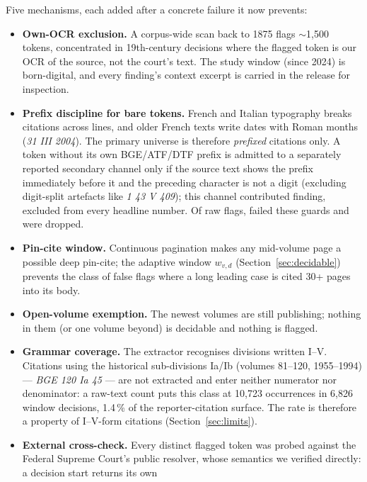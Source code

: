 \documentclass[11pt,a4paper]{article}
\begin{document}
Five mechanisms, each added after a concrete failure it now prevents:
\begin{itemize}
\item \textbf{Own-OCR exclusion.} A corpus-wide scan back to 1875 flags
      $\sim$1{,}500 tokens, concentrated in 19th-century decisions
      where the flagged token is our OCR of the source, not the court's
      text. The study window (since 2024) is born-digital, and every
      finding's context excerpt is carried in the release for
      inspection.
\item \textbf{Prefix discipline for bare tokens.} French and Italian
      typography breaks citations across lines, and older French texts
      write dates with Roman months (\emph{31 III 2004}). The primary
      universe is therefore \emph{prefixed} citations only. A token
      without its own BGE/ATF/DTF prefix is admitted to a separately
      reported secondary channel only if the source text shows the
      prefix immediately before it and the preceding character is not a
      digit (excluding digit-split artefacts like \emph{1 43 V 409});
      this channel contributed \NBareFindings{} finding, excluded from
      every headline number. Of \NRawFindings{} raw flags,
      \NDroppedGuard{} failed these guards and were dropped.
\item \textbf{Pin-cite window.} Continuous pagination makes any
      mid-volume page a possible deep pin-cite; the adaptive window
      $w_{v,d}$ (Section~\ref{sec:decidable}) prevents the class of
      false flags where a long leading case is cited 30+ pages into its
      body.
\item \textbf{Open-volume exemption.} The newest volumes are still
      publishing; nothing in them (or one volume beyond) is decidable
      and nothing is flagged.
\item \textbf{Grammar coverage.} The extractor recognises divisions
      written I--V. Citations using the historical sub-divisions Ia/Ib
      (volumes 81--120, 1955--1994) --- \emph{BGE 120 Ia 45} --- are
      not extracted and enter neither numerator nor denominator: a
      raw-text count puts this class at 10{,}723 occurrences in
      6{,}826 window decisions, 1.4\,\% of the reporter-citation
      surface. The rate is therefore a property of I--V-form
      citations (Section~\ref{sec:limits}).
\item \textbf{External cross-check.} Every distinct flagged token was
      probed against the Federal Supreme Court's public resolver, whose
      semantics we verified directly: a decision start returns its own

\end{itemize}
\end{document}
